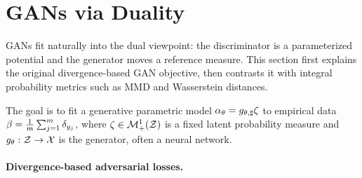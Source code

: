 \section{GANs via Duality}
\label{sec-gan-duality}


GANs fit naturally into the dual viewpoint: the discriminator is a parameterized potential and the generator moves a reference measure. This section first explains the original divergence-based GAN objective, then contrasts it with integral probability metrics such as MMD and Wasserstein distances.

The goal is to fit a generative parametric model $\alpha_\theta = g_{\theta,\sharp} \zeta$ to empirical data $\beta = \frac{1}{m}\sum_{j=1}^m \delta_{y_j}$, where $\zeta \in \mathcal{M}_+^1(\mathcal{Z})$ is a fixed latent probability measure and $g_\theta : \mathcal{Z} \rightarrow \mathcal{X}$ is the generator, often a neural network.

\paragraph{Divergence-based adversarial losses.}


